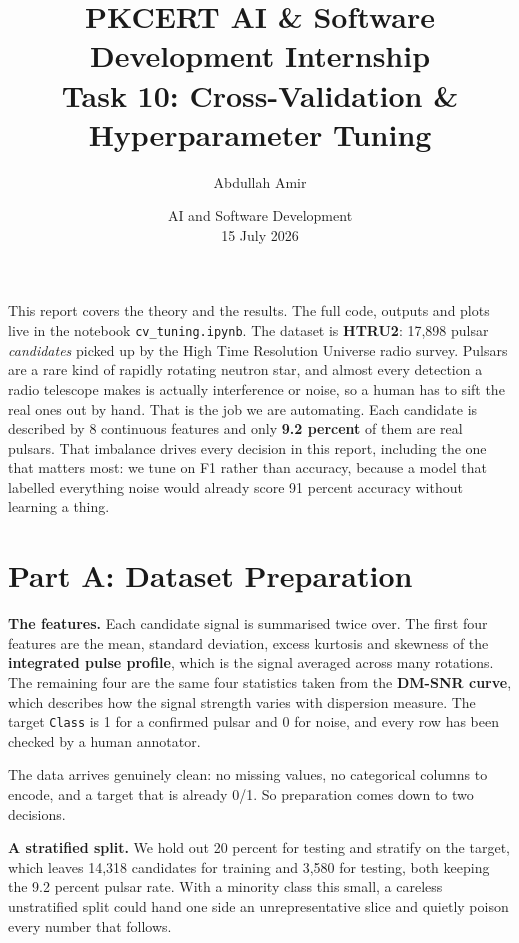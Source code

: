 \documentclass[11pt,a4paper]{article}
\title{\vspace{-1.5cm}\textbf{PKCERT AI \& Software Development Internship \\ Task 10: Cross-Validation \& Hyperparameter Tuning}}
\author{Abdullah Amir}
\date{AI and Software Development \\ 15 July 2026}
\begin{document}
\maketitle
\vspace{-0.8cm}

This report covers the theory and the results. The full code, outputs and plots live
in the notebook \texttt{cv\_tuning.ipynb}. The dataset is \textbf{HTRU2}: 17,898
pulsar \emph{candidates} picked up by the High Time Resolution Universe radio survey.
Pulsars are a rare kind of rapidly rotating neutron star, and almost every detection a
radio telescope makes is actually interference or noise, so a human has to sift the
real ones out by hand. That is the job we are automating. Each candidate is described
by 8 continuous features and only \textbf{9.2 percent} of them are real pulsars. That
imbalance drives every decision in this report, including the one that matters most:
we tune on F1 rather than accuracy, because a model that labelled everything noise
would already score 91 percent accuracy without learning a thing.

\section*{Part A: Dataset Preparation}

\textbf{The features.} Each candidate signal is summarised twice over. The first four
features are the mean, standard deviation, excess kurtosis and skewness of the
\textbf{integrated pulse profile}, which is the signal averaged across many rotations.
The remaining four are the same four statistics taken from the \textbf{DM-SNR curve},
which describes how the signal strength varies with dispersion measure. The target
\texttt{Class} is 1 for a confirmed pulsar and 0 for noise, and every row has been
checked by a human annotator.

The data arrives genuinely clean: no missing values, no categorical columns to encode,
and a target that is already 0/1. So preparation comes down to two decisions.

\textbf{A stratified split.} We hold out 20 percent for testing and stratify on the
target, which leaves 14,318 candidates for training and 3,580 for testing, both
keeping the 9.2 percent pulsar rate. With a minority class this small, a careless
unstratified split could hand one side an unrepresentative slice and quietly poison
every number that follows.
\end{document}
